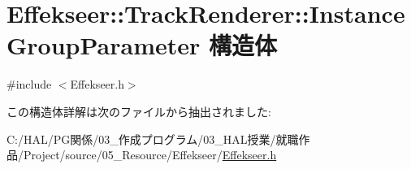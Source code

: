 \hypertarget{struct_effekseer_1_1_track_renderer_1_1_instance_group_parameter}{}\section{Effekseer\+:\+:Track\+Renderer\+:\+:Instance\+Group\+Parameter 構造体}
\label{struct_effekseer_1_1_track_renderer_1_1_instance_group_parameter}


{\ttfamily \#include $<$Effekseer.\+h$>$}



この構造体詳解は次のファイルから抽出されました\+:\begin{DoxyCompactItemize}
\item 
C\+:/\+H\+A\+L/\+P\+G関係/03\+\_\+作成プログラム/03\+\_\+\+H\+A\+L授業/就職作品/\+Project/source/05\+\_\+\+Resource/\+Effekseer/\mbox{\hyperlink{_effekseer_8h}{Effekseer.\+h}}\end{DoxyCompactItemize}
